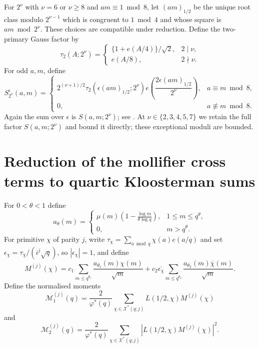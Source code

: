 \documentclass[12pt, a4paper]{amsart}
\numberwithin{equation}{section}
\newcommand{\e}{e}
\renewcommand{\le}{\leqslant}
\renewcommand{\ge}{\geqslant}
\theoremstyle{plain}
\begin{document}
For $2^\nu$ with $\nu=6$ or $\nu\ge8$ and $am\equiv1\bmod8$, let $(am)_{1/2}$ be the unique root class modulo $2^{\nu-1}$ which is congruent to $1\bmod4$ and whose square is $am\bmod {2^\nu}$. These choices are compatible under reduction. Define the two-primary Gauss factor by
\begin{equation}\label{eq:reciprocal-two-gauss-sign}
 \tau_2(A;2^\nu)=
 \begin{cases}
  \{1+\e(A/4)\}/\sqrt2,&2\mid\nu,\\
  \e(A/8),&2\nmid\nu.
 \end{cases}
\end{equation}
For odd $a,m$, define
\begin{equation}\label{eq:reciprocal-two-branch}
 S_{2^\nu}^{\epsilon}(a,m)=
 \begin{cases}
  2^{(\nu+1)/2}\tau_2
   \left(\epsilon(am)_{1/2};2^\nu\right)
   \e\left(\dfrac{2\epsilon(am)_{1/2}}{2^\nu}\right),
       &a\equiv m\bmod8,\\
  0,&a\not\equiv m\bmod8.
 \end{cases}
\end{equation}
Again the sum over $\epsilon$ is $S(a,m;2^\nu)$; see \cite[Section~3.1]{MQW}. At $\nu\in\{2,3,4,5,7\}$ we retain the full factor $S(a,m;2^\nu)$ and bound it directly; these exceptional moduli are bounded.

\section{Reduction of the mollifier cross terms to quartic Kloosterman sums}\label{sec:qw-reduction}

For $0<\theta<1$ define
$$
a_\theta(m)=
\begin{cases}
\mu(m)\left(1-\frac{\log m}{\theta\log q}\right),
&1\le m\le q^\theta,\\
0,&m>q^\theta.
\end{cases}
$$
For primitive $\chi$ of parity $j$, write $\tau_\chi=\sum_{a\bmod q}\chi(a)\e(a/q)$ and set $\epsilon_\chi=\tau_\chi/(i^j\sqrt q)$, so $|\epsilon_\chi|=1$, and define
\begin{equation}\label{eq:two-piece-mollifier}
M^{(j)}(\chi)
=
c_1\sum_{m\le q^{\theta_1}}\frac{a_{\theta_1}(m)\chi(m)}{\sqrt m}
+
c_2\overline{\epsilon_\chi}
\sum_{m\le q^{\theta_2}}\frac{a_{\theta_2}(m)\overline\chi(m)}{\sqrt m}.
\end{equation}
Define the normalised moments
$$
\mathcal M_1^{(j)}(q)
=
\frac{2}{\varphi^*(q)}
\sum_{\chi\in\mathcal X^*(q;j)}
L(1/2,\chi)M^{(j)}(\chi)
$$
and
$$
\mathcal M_2^{(j)}(q)
=
\frac{2}{\varphi^*(q)}
\sum_{\chi\in\mathcal X^*(q;j)}
|L(1/2,\chi)M^{(j)}(\chi)|^2.
$$
\end{document}
